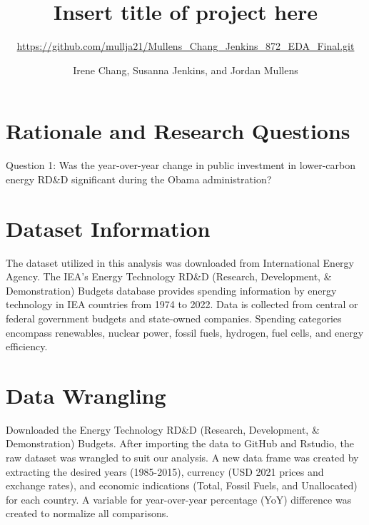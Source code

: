 \documentclass[
  12pt,
]{article}
\title{Insert title of project here}
\subtitle{\url{https://github.com/mullja21/Mullens_Chang_Jenkins_872_EDA_Final.git}}
\author{Irene Chang, Susanna Jenkins, and Jordan Mullens}
\date{}
\begin{document}
\maketitle

\newpage
\tableofcontents 
\newpage
\listoftables 
\newpage
\listoffigures 
\newpage

\hypertarget{rationale-and-research-questions}{%
\section{Rationale and Research
Questions}\label{rationale-and-research-questions}}

Question 1: Was the year-over-year change in public investment in
lower-carbon energy RD\&D significant during the Obama administration?

\newpage

\hypertarget{dataset-information}{%
\section{Dataset Information}\label{dataset-information}}

The dataset utilized in this analysis was downloaded from International
Energy Agency. The IEA's Energy Technology RD\&D (Research, Development,
\& Demonstration) Budgets database provides spending information by
energy technology in IEA countries from 1974 to 2022. Data is collected
from central or federal government budgets and state-owned companies.
Spending categories encompass renewables, nuclear power, fossil fuels,
hydrogen, fuel cells, and energy efficiency.

\newpage

\hypertarget{data-wrangling}{%
\section{Data Wrangling}\label{data-wrangling}}

Downloaded the Energy Technology RD\&D (Research, Development, \&
Demonstration) Budgets. After importing the data to GitHub and Rstudio,
the raw dataset was wrangled to suit our analysis. A new data frame was
created by extracting the desired years (1985-2015), currency (USD 2021
prices and exchange rates), and economic indications (Total, Fossil
Fuels, and Unallocated) for each country. A variable for year-over-year
percentage (YoY) difference was created to normalize all comparisons.
\end{document}
